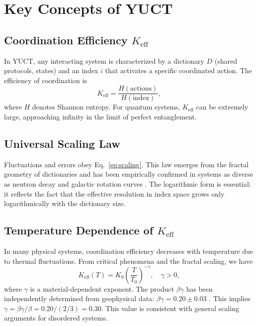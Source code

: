 \documentclass[12pt,a4paper]{article}
\newcommand{\Keff}{K_{\mathrm{eff}}}
\newcommand{\betagamma}{\beta\gamma}
\newcommand{\betac}{\beta}
\begin{document}
	\section{Key Concepts of YUCT}
	
	\subsection{Coordination Efficiency \(\Keff\)}
	
	In YUCT, any interacting system is characterized by a dictionary \(D\) (shared protocols, states) and an index \(i\) that activates a specific coordinated action. The efficiency of coordination is
	\begin{equation}
		\Keff = \frac{H(\text{actions})}{H(\text{index})},
	\end{equation}
	where \(H\) denotes Shannon entropy. For quantum systems, \(\Keff\) can be extremely large, approaching infinity in the limit of perfect entanglement.
	
	\subsection{Universal Scaling Law}
	
	Fluctuations and errors obey Eq.~\eqref{eq:scaling}. This law emerges from the fractal geometry of dictionaries and has been empirically confirmed in systems as diverse as neutron decay and galactic rotation curves \cite{Yakushev2026c}. The logarithmic form is essential: it reflects the fact that the effective resolution in index space grows only logarithmically with the dictionary size.
	
	\subsection{Temperature Dependence of \(\Keff\)}
	
	In many physical systems, coordination efficiency decreases with temperature due to thermal fluctuations. From critical phenomena and the fractal scaling, we have
	\begin{equation}
		\Keff(T) = K_0 \left(\frac{T}{T_0}\right)^{-\gamma}, \quad \gamma > 0,
		\label{eq:K_T}
	\end{equation}
	where \(\gamma\) is a material-dependent exponent. The product \(\betac\gamma\) has been independently determined from geophysical data: \(\betagamma = 0.20 \pm 0.03\) \cite{Yakushev2026b}. This implies \(\gamma = \betagamma / \betac = 0.20 / (2/3) = 0.30\). This value is consistent with general scaling arguments for disordered systems.
	
\end{document}
